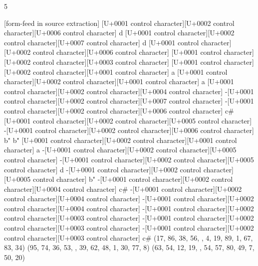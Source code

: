 \documentclass[10pt]{article}
\begin{document}
\begin{ReviewVerbatim}
                                                    5

[form-feed in source extraction]
 [U+0001 control character][U+0002 control character][U+0006 control character]
                                                      d     [U+0001 control character][U+0002 control character][U+0007 control character]                                                  d     [U+0001 control character][U+0002 control character][U+0006 control character]
 [U+0001 control character][U+0002 control character][U+0003 control character]
                                                            [U+0001 control character][U+0002 control character][U+0001 control character]                                                  a     [U+0001 control character][U+0002 control character][U+0001 control character]                                                   a
 [U+0001 control character][U+0002 control character][U+0004 control character]
                                                           -[U+0001 control character][U+0002 control character][U+0007 control character]                                                       -[U+0001 control character][U+0002 control character][U+0006 control character]                                                   c#
 [U+0001 control character][U+0002 control character][U+0005 control character]
                                                           -[U+0001 control character][U+0002 control character][U+0006 control character]                                                  b"                                                          b"
 [U+0001 control character][U+0002 control character][U+0001 control character]                                                  a    -[U+0001 control character][U+0002 control character][U+0005 control character]
                                                                                                                      -[U+0001 control character][U+0002 control character][U+0005 control character]
                                                                                                                                                                             d
-[U+0001 control character][U+0002 control character][U+0005 control character]
                                                      b"   -[U+0001 control character][U+0002 control character][U+0004 control character]                                                  c#   -[U+0001 control character][U+0002 control character][U+0004 control character]
-[U+0001 control character][U+0002 control character][U+0004 control character]
                                                           -[U+0001 control character][U+0002 control character][U+0003 control character]                                                       -[U+0001 control character][U+0002 control character][U+0003 control character]
-[U+0001 control character][U+0002 control character][U+0003 control character]                                                  c#
       (17, 86, 38, 56, , 4, 19, 89, 1, 67, 83, 34)               (95, 74, 36, 53, , 39, 62, 48, 1, 30, 77, 8)               (63, 54, 12, 19, , 54, 57, 80, 49, 7, 50, 20)
\end{ReviewVerbatim}
\end{document}
